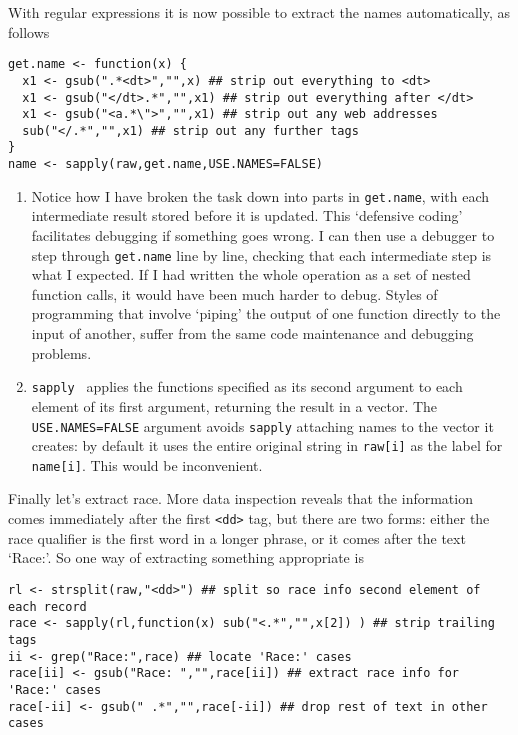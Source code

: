 \documentclass[10pt] {article}
\theoremstyle{definition}
\begin{document}
With regular expressions it is now possible to extract the names automatically, as follows
\begin{lstlisting}
get.name <- function(x) {
  x1 <- gsub(".*<dt>","",x) ## strip out everything to <dt>
  x1 <- gsub("</dt>.*","",x1) ## strip out everything after </dt>
  x1 <- gsub("<a.*\">","",x1) ## strip out any web addresses
  sub("</.*","",x1) ## strip out any further tags
}
name <- sapply(raw,get.name,USE.NAMES=FALSE)
\end{lstlisting}
\begin{enumerate}
\item Notice how I have broken the task down into parts in \lstinline+get.name+, with each intermediate result stored before it is updated. This `defensive coding' facilitates debugging if something goes wrong. I can then use a debugger to step through \lstinline+get.name+ line by line, checking that each intermediate step is what I expected. If I had written the whole operation as a set of nested function calls, it would have been much harder to debug. Styles of programming that involve `piping' the output of one function directly to the input of another, suffer from the same code maintenance and debugging problems.      
\item {\tt sapply } applies the functions specified as its second argument to each element of its first argument, returning the result in a vector. The \lstinline+USE.NAMES=FALSE+ argument avoids {\tt sapply} attaching names to the vector it creates: by default it uses the entire original string in \verb+raw[i]+ as the label for \verb+name[i]+. This would be inconvenient.
\end{enumerate}

Finally let's extract race. More data inspection reveals that the information comes immediately after the first \verb+<dd>+ tag, but there are two forms: either the race qualifier is the first word in a longer phrase, or it comes after the text `Race:'. So one way of extracting something appropriate is 
\begin{lstlisting}
rl <- strsplit(raw,"<dd>") ## split so race info second element of each record
race <- sapply(rl,function(x) sub("<.*","",x[2]) ) ## strip trailing tags
ii <- grep("Race:",race) ## locate 'Race:' cases
race[ii] <- gsub("Race: ","",race[ii]) ## extract race info for 'Race:' cases
race[-ii] <- gsub(" .*","",race[-ii]) ## drop rest of text in other cases
\end{lstlisting}
\end{document}
